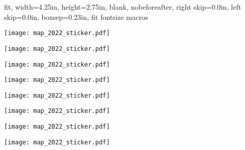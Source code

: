 \documentclass[10pt,letterpaper]{article}
\begin{document}
{
  fit,
  width=4.25in,
  height=2.75in,
  blank,
  nobeforeafter,
  right skip=0.0in,
  left skip=0.0in,
  boxsep=0.23in,
  fit fontsize macros
}

\renewcommand{\baselinestretch}{0.8} 

\def\stickercontent{\begin{sticker}\texttt{[image: map\_2022\_sticker.pdf]}
\end{sticker}
}



\stickercontent
\horizontalshiftfornextsticker
\stickercontent
\verticalshiftfornextsticker
\stickercontent
\horizontalshiftfornextsticker
\stickercontent
\verticalshiftfornextsticker
\stickercontent
\horizontalshiftfornextsticker
\stickercontent
\verticalshiftfornextsticker
\stickercontent
\horizontalshiftfornextsticker
\stickercontent
\end{document}
